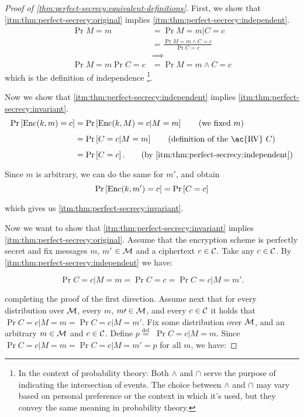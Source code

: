 \begin{proof}[Proof of \cref{thm:perfect-secrecy:equivalent-definitions}]
	First, we show that \ref{itm:thm:perfect-secrecy:original} implies \ref{itm:thm:perfect-secrecy:independent}.
	\begin{align*}
		\Pr{M=m} & = \Pr{M = m | C = c} \\
		& = \frac{\Pr{M = m \land C = c}}{\Pr{C = c}} \tag{by Bayes}
		\\
		& \implies \\
		\Pr{M = m} \Pr{C = c}
		& =
		\Pr{M = m \land C = c}
	\end{align*}
	which is the definition of independence \footnote{In the context of probability theory: Both \( \land \) and \( \cap \) serve the purpose of indicating the intersection of events. The choice between \( \land \) and \( \cap \) may vary based on personal preference or the context in which it's used, but they convey the same meaning in probability theory.}.

	Now we show that \ref{itm:thm:perfect-secrecy:independent} implies \ref{itm:thm:perfect-secrecy:invariant}.
	\begin{align*}
		\Pr{\GenericEnc(k, m) = c} 
		& =
		\Pr{\GenericEnc(k, M) = c | M = m} \tag{we fixed $m$}
		\\
		& = \Pr{C = c | M = m} \tag{definition of the \ac{RV} $C$}
		\\
		& = \Pr{C = c}. \tag{by \ref{itm:thm:perfect-secrecy:independent}}
	\end{align*}
	Since $m$ is arbitrary, we can do the same for $m'$, and obtain
	\begin{equation*}
		\mathop{\mathrm{Pr}}\limits_{} \left[ {\mathrm{Enc}(k,m') = c} \right] = \mathop{\mathrm{Pr}}\limits_{} \left[ {C = c} \right]
	\end{equation*}
	which gives us \ref{itm:thm:perfect-secrecy:invariant}.

	Now we want to show that \ref{itm:thm:perfect-secrecy:invariant} implies \ref{itm:thm:perfect-secrecy:original}. Assume that the encryption scheme is perfectly secret and fix messages $m$, $m\prime$ $\in \mathcal{M}$ and a ciphertext $c \in \mathcal{C}$. Take any $c \in \mathcal{C}$. By \ref{itm:thm:perfect-secrecy:independent} we have:

	\begin{equation*}
		\Pr {C = c | M = m} = \Pr {C = c} = \Pr {C = c | M = m'}.
	\end{equation*}

	completing the proof of the first direction.
	Assume next that for every distribution over $\mathcal{M}$, every $m$, $m\prime \in \mathcal{M}$, and every $c \in \mathcal{C}$ it holds that $\Pr {C = c | M = m} = \Pr {C = c | M = m\prime}$. Fix some distribution over $\mathcal{M}$, and an arbitrary $m \in \mathcal{M}$ and $c \in \mathcal{C}$. Define $p \stackrel{\text{def}}{=}$ $\Pr {C = c | M = m}$. Since $\Pr {C = c | M = m} = \Pr {C = c | M = m'} = p$ for all $m$, we have:


\end{proof}
